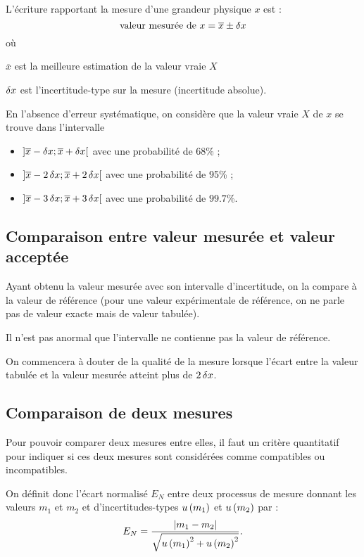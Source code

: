 L'écriture rapportant la mesure d'une grandeur physique \(x\) est : \[\text{valeur mesurée de }x=\overline{x}\pm\fdif{x}\] où \begin{description}
\item \(\overline{x}\) est la meilleure estimation de la valeur vraie \(X\)
\item \(\fdif{x}\) est l'incertitude-type sur la mesure (incertitude absolue). \\
\end{description}

En l'absence d'erreur systématique, on considère que la valeur vraie \(X\) de \(x\) se trouve dans l'intervalle \begin{itemize}
\item \(\intervee{\overline{x}-\fdif{x}}{\overline{x}+\fdif{x}}\) avec une probabilité de 68\% ;
\item \(\intervee{\overline{x}-2\fdif{x}}{\overline{x}+2\fdif{x}}\) avec une probabilité de 95\% ;
\item \(\intervee{\overline{x}-3\fdif{x}}{\overline{x}+3\fdif{x}}\) avec une probabilité de \(\num{99.7}\)\%.
\end{itemize}

\subsection{Comparaison entre valeur mesurée et valeur acceptée}

Ayant obtenu la valeur mesurée avec son intervalle d'incertitude, on la compare à la valeur de référence (pour une valeur expérimentale de référence, on ne parle pas de valeur exacte mais de valeur tabulée).

Il n'est pas anormal que l'intervalle ne contienne pas la valeur de référence.

On commencera à douter de la qualité de la mesure lorsque l'écart entre la valeur tabulée et la valeur mesurée atteint plus de \(2\fdif{x}\).

\subsection{Comparaison de deux mesures}

Pour pouvoir comparer deux mesures entre elles, il faut un critère quantitatif pour indiquer si ces deux mesures sont considérées comme compatibles ou incompatibles.

On définit donc l'écart normalisé \(E_N\) entre deux processus de mesure donnant les valeurs \(m_1\) et \(m_2\) et d'incertitudes-types \(u\left(m_1\right)\) et \(u\left(m_2\right)\) par : \[E_N=\dfrac{\left\lvert m_1-m_2\right\rvert}{\sqrt{u\left(m_1\right)^2+u\left(m_2\right)^2}}.\]

